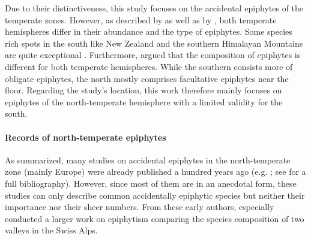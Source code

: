 \documentclass[12pt, a4paper, oneside, draft]{scrartcl}
\begin{document}
	Due to their distinctiveness, this study focuses on the accidental epiphytes of the temperate zones. However, as described by \textcite{Schimper1888} as well as by \textcite{Gentry1987a}, both temperate hemispheres differ in their abundance and the type of epiphytes. Some species rich spots in the south like New Zealand and the southern Himalayan Mountains are quite exceptional \parencite[see ZotzBibliography]{Schimper1888, Hofstede2001}. Furthermore, \textcite{Burns2010} argued that the composition of epiphytes is different for both temperate hemispheres. While the southern consists more of obligate epiphytes, the north mostly comprises facultative epiphytes near the floor. Regarding the study's location, this work therefore mainly focuses on epiphytes of the north-temperate hemisphere with a limited validity for the south.
	
	
	\paragraph{Records of north-temperate epiphytes}
	As \textcite{Zotz2003} summarized, many studies on accidental epiphytes in the north-temperate zone (mainly Europe) were already published a hundred years ago  (e.g. \cite{Schimper1888, Beyle1903, Beyer1896, Staeger1908, Staeger1912,Magnin1895,Loew1892}; see \textcite{Zotz2003a} for a full bibliography). However, since most of them are in an anecdotal form, these studies can only describe common accidentally epiphytic species but neither their importance nor their sheer numbers. From these early authors, especially \textcite{Staeger1908} conducted a larger work on epiphytism comparing the species composition of two valleys in the Swiss Alps.
	
\end{document}

